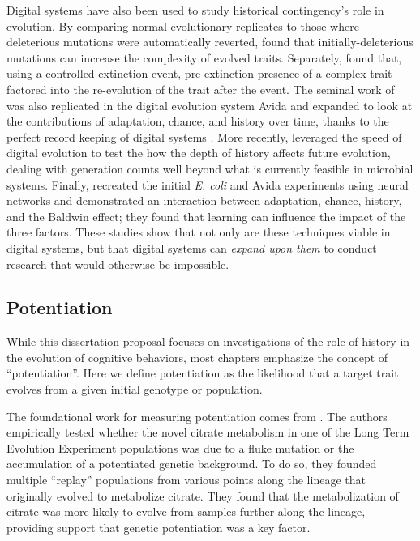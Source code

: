 Digital systems have also been used to study historical contingency's role in evolution. %
By comparing normal evolutionary replicates to those where deleterious mutations were automatically reverted, \citet{covertiiiExperimentsRoleDeleterious2013} found that initially-deleterious mutations can increase the complexity of evolved traits. 
Separately, \citet{yedidHistoricalContingentFactors2008} found that, using a controlled extinction event, pre-extinction presence of a complex trait factored into the re-evolution of the trait after the event. 
The seminal work of \citet{travisanoExperimentalTestsRoles1995} was also replicated in the digital evolution system Avida and expanded to look at the contributions of adaptation, chance, and history over time, thanks to the perfect record keeping of digital systems \citep{wagenaarInfluenceChanceHistory2004}.
More recently, \citet{bundyHowFootprintHistory2021} leveraged the speed of digital evolution to test the how the depth of history affects future evolution, dealing with generation counts well beyond what is currently feasible in microbial systems. 
Finally, \citet{braughtEffectsLearningRoles2007} recreated the initial \textit{E. coli} and Avida experiments using neural networks and demonstrated an interaction between adaptation, chance, history, and the Baldwin effect; they found that learning can influence the impact of the three factors. 
These studies show that not only are these techniques viable in digital systems, but that digital systems can \textit{expand upon them} to conduct research that would otherwise be impossible.

\subsection{Potentiation}

While this dissertation proposal focuses on investigations of the role of history in the evolution of cognitive behaviors, most chapters emphasize the concept of ``potentiation''. 
Here we define potentiation as the likelihood that a target trait evolves from a given initial genotype or population.

The foundational work for measuring potentiation comes from \citet{blountHistoricalContingencyEvolution2008}. 
The authors empirically tested whether the novel citrate metabolism in one of the Long Term Evolution Experiment populations \citep{lenskiLongtermExperimentalEvolution1991} was due to a fluke mutation or the accumulation of a potentiated genetic background. 
To do so, they founded multiple ``replay'' populations from various points along the lineage that originally evolved to metabolize citrate. 
They found that the metabolization of citrate was more likely to evolve from samples further along the lineage, providing support that genetic potentiation was a key factor. 

